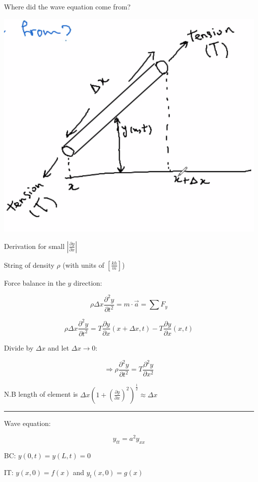 \documentclass{article}
\begin{document}
\hfill

Where did the wave equation come from?

\includegraphics[width = 0.9 \textwidth]{image1.png}

Derivation for small $\left| \frac{\partial y}{\partial x} \right|$

String of density $\rho$ (with units of $\left[ \frac{kh}{m} \right]$)

Force balance in the $y$ direction:

$$\rho \Delta x \frac{\partial^2 y}{\partial t^2} = m \cdot \vec{a} = \sum F_y$$


$$\rho \Delta x \frac{\partial^2 y}{\partial t^2} = T \frac{\partial y}{\partial x} \left( x + \Delta x, t \right) - T \frac{\partial y}{\partial x} (x,t)$$

Divide by $\Delta x$ and let $\Delta x \to 0$:

$$\Rightarrow \rho \frac{\partial^2 y}{\partial t^2} = T \frac{\partial^2 y}{\partial x^2}$$

N.B length of element is $\Delta x (1 + (\frac{\partial y}{\partial x})^2 )^{\frac{1}{2}} \approx \Delta x$

\hfill

\hrule

\hfill

Wave equation: 

$$y_{tt} = a^2 y_{xx}$$

\begin{center}
    BC: $y(0,t) = y(L,t) = 0$
    
    IT: $y(x,0) = f(x)$ and $y_t(x,0) = g(x)$
\end{center}
\end{document}
